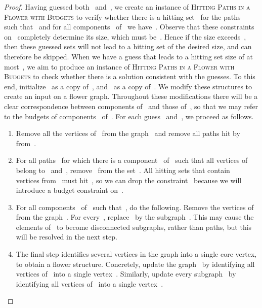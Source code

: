 \let\accentvec\vec  \documentclass{llncs}
\newcommand{\HitPathsInFlower}{\textsc{Hitting Paths in a Flower with Budgets}\xspace}
\begin{document}
\begin{proof}
Having guessed both~ and~, we create an instance of \HitPathsInFlower to verify whether there is a hitting set~ for the paths~ such that~ and for all components~ of~ we have~. Observe that these constraints on~ completely determine its size, which must be~. Hence if the size exceeds~, then these guessed sets will not lead to a hitting set of the desired size, and can therefore be skipped. When we have a guess that leads to a hitting set size of at most~, we aim to produce an instance of \HitPathsInFlower to check whether there is a solution consistent with the guesses. To this end, initialize~ as a copy of~, and~ as a copy of~. We modify these structures to create an input on a flower graph. Throughout these modifications there will be a clear correspondence between components of~ and those of~, so that we may refer to the budgets of components~ of~. For each guess~ and~, we proceed as follows.

\begin{enumerate}
	\item Remove all the vertices of~ from the graph~ and remove all paths hit by~ from~.\label{flower:step:removeshitpaths}
	\item For all paths~ for which there is a component~ of~ such that all vertices of~ belong to~ and~, remove~ from the set~. All hitting sets that contain~ vertices from~ must hit~, so we can drop the constraint~ because we will introduce a budget constraint on~.\label{flower:step:removebudgethitpaths}
	\item For all components~ of~ such that~, do the following. Remove the vertices of~ from the graph~. For every~, replace~ by the subgraph~. This may cause the elements of~ to become disconnected subgraphs, rather than paths, but this will be resolved in the next step.\label{flower:step:splitpaths}
	\item The final step identifies several vertices in the graph into a single core vertex, to obtain a flower structure. Concretely, update the graph~ by identifying all vertices of~ into a single vertex~. Similarly, update every subgraph~ by identifying all vertices of~ into a single vertex~.\label{flower:step:merge}
\end{enumerate}


\end{proof}
\end{document}
